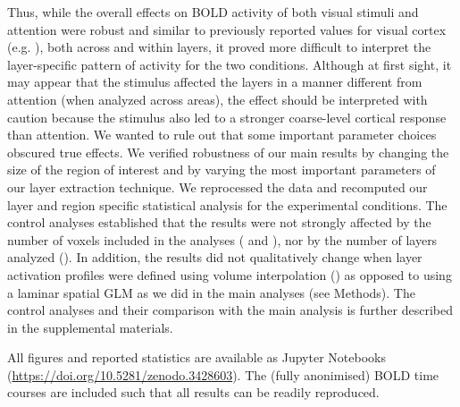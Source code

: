 \documentclass[9pt,lineno]{aperture}
\begin{document}
Thus, while the overall effects on BOLD activity of both visual stimuli and attention were robust and similar to previously reported values for visual cortex (e.g. \citep{Kastner1999,Jehee2011, Koopmans2010}), both across and within layers, it proved more difficult to interpret the layer-specific pattern of activity for the two conditions. Although at first sight, it may appear that the stimulus affected the layers in a manner different from attention (when analyzed across areas), the effect should be interpreted with caution because the stimulus also led to a stronger coarse-level cortical response than attention. 
We wanted to rule out that some important parameter choices obscured true effects. We verified robustness of our main results by changing the size of the region of interest and by varying the most important parameters of our layer extraction technique. We reprocessed the data and recomputed our layer and region specific statistical analysis for the experimental conditions. The control analyses established that the results were not strongly affected by the number of voxels included in the analyses ( and ), nor by the number of layers analyzed (). In addition, the results did not qualitatively change when layer activation profiles were defined using volume interpolation () as opposed to using a laminar spatial GLM as we did in the main analyses (see Methods). The control analyses and their comparison with the main analysis is further described in the supplemental materials. 

All figures and reported statistics are available as Jupyter Notebooks (\url{https://doi.org/10.5281/zenodo.3428603}). The (fully anonimised) BOLD time courses are included such that all results can be readily reproduced. 
\end{document}
